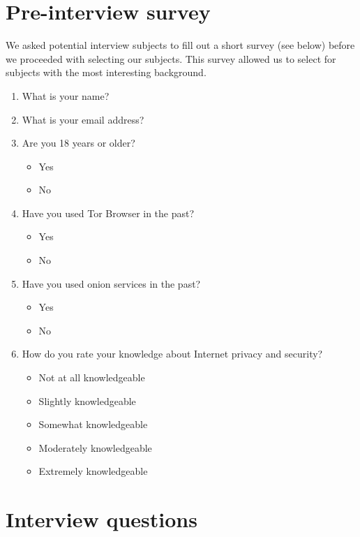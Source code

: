 \appendix

\section{Pre-interview survey}
\label{sec:interview-survey}
We asked potential interview subjects to fill out a short survey (see below)
before we proceeded with selecting our subjects.  This survey allowed us to
select for subjects with the most interesting background.

\begin{enumerate}
    \item What is your name?
    \item What is your email address?
    \item Are you 18 years or older?
        \begin{itemize}[label=$\Circle$]
            \item Yes
            \item No
        \end{itemize}
    \item Have you used Tor Browser in the past?
        \begin{itemize}[label=$\Circle$]
            \item Yes
            \item No
        \end{itemize}
    \item Have you used onion services in the past?
        \begin{itemize}[label=$\Circle$]
            \item Yes
            \item No
        \end{itemize}
    \item How do you rate your knowledge about Internet privacy and security?
        \begin{itemize}[label=$\Circle$]
            \item Not at all knowledgeable
            \item Slightly knowledgeable
            \item Somewhat knowledgeable
            \item Moderately knowledgeable
            \item Extremely knowledgeable
        \end{itemize}
\end{enumerate}

\section{Interview questions}
\label{app:interview-questions}

